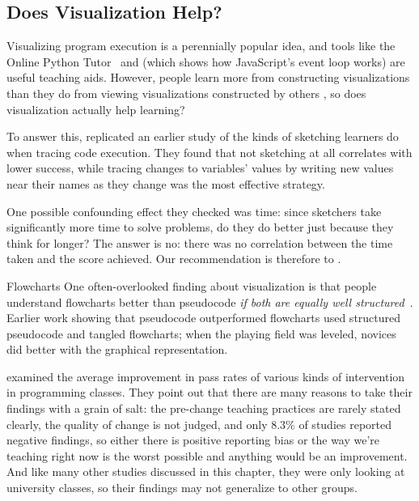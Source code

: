 \subsection*{Does Visualization Help?}

Visualizing program execution is a perennially popular idea,
and tools like the Online Python Tutor~\cite{Guo2013}
and 
(which shows how JavaScript's event loop works)
are useful teaching aids.
However,
people learn more from constructing visualizations
than they do from viewing visualizations constructed by others \cite{Stas1998,Ceti2016},
so does visualization actually help learning?

To answer this,
\cite{Cunn2017} replicated an earlier study of the kinds of sketching learners do when tracing code execution.
They found that not sketching at all correlates with lower success,
while tracing changes to variables' values by writing new values near their names as they change was the most effective strategy.

One possible confounding effect they checked was time:
since sketchers take significantly more time to solve problems,
do they do better just because they think for longer?
The answer is no:
there was no correlation between the time taken and the score achieved.
Our recommendation is therefore to .

\begin{aside}{Flowcharts}
  One often-overlooked finding about visualization is that
  people understand flowcharts better than pseudocode \emph{if both are equally well structured}~\cite{Scan1989}.
  Earlier work showing that pseudocode outperformed flowcharts used structured pseudocode and tangled flowcharts;
  when the playing field was leveled,
  novices did better with the graphical representation.
\end{aside}


\cite{Viha2014} examined the average improvement in pass rates of various kinds of intervention in programming classes.
They point out that there are many reasons to take their findings with a grain of salt:
the pre-change teaching practices are rarely stated clearly,
the quality of change is not judged,
and only 8.3\% of studies reported negative findings,
so either there is positive reporting bias
or the way we're teaching right now is the worst possible and anything would be an improvement.
And like many other studies discussed in this chapter,
they were only looking at university classes,
so their findings may not generalize to other groups.


